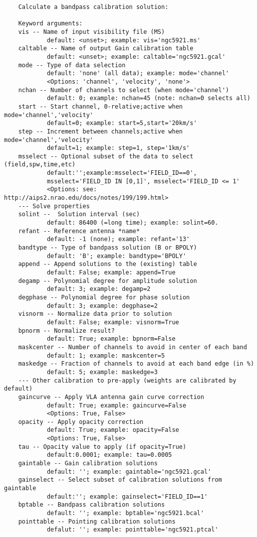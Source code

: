 \small
\begin{verbatim}
    Calculate a bandpass calibration solution:
    
    Keyword arguments:
    vis -- Name of input visibility file (MS)
            default: <unset>; example: vis='ngc5921.ms'
    caltable -- Name of output Gain calibration table
            default: <unset>; example: caltable='ngc5921.gcal'
    mode -- Type of data selection
            default: 'none' (all data); example: mode='channel'
            <Options: 'channel', 'velocity', 'none'>
    nchan -- Number of channels to select (when mode='channel')
            default: 0; example: nchan=45 (note: nchan=0 selects all)
    start -- Start channel, 0-relative;active when mode='channel','velocity'
            default=0; example: start=5,start='20km/s'
    step -- Increment between channels;active when mode='channel','velocity'
            default=1; example: step=1, step='1km/s'
    msselect -- Optional subset of the data to select (field,spw,time,etc)
            default:'';example:msselect='FIELD_ID==0', 
            msselect='FIELD_ID IN [0,1]', msselect='FIELD_ID <= 1'
            <Options: see: http://aips2.nrao.edu/docs/notes/199/199.html>
    --- Solve properties
    solint --  Solution interval (sec)
            default: 86400 (=long time); example: solint=60.
    refant -- Reference antenna *name*
            default: -1 (none); example: refant='13'
    bandtype -- Type of bandpass solution (B or BPOLY)
            default: 'B'; example: bandtype='BPOLY'
    append -- Append solutions to the (existing) table
            default: False; example: append=True
    degamp -- Polynomial degree for amplitude solution
            default: 3; example: degamp=2
    degphase -- Polynomial degree for phase solution
            default: 3; example: degphase=2
    visnorm -- Normalize data prior to solution
            default: False; example: visnorm=True
    bpnorm -- Normalize result?
            default: True; example: bpnorm=False
    maskcenter -- Number of channels to avoid in center of each band
            default: 1; example: maskcenter=5
    maskedge -- Fraction of channels to avoid at each band edge (in %)
            default: 5; example: maskedge=3
    --- Other calibration to pre-apply (weights are calibrated by default)
    gaincurve -- Apply VLA antenna gain curve correction
            default: True; example: gaincurve=False
            <Options: True, False>
    opacity -- Apply opacity correction
            default: True; example: opacity=False
            <Options: True, False>
    tau -- Opacity value to apply (if opacity=True)
            default:0.0001; example: tau=0.0005
    gaintable -- Gain calibration solutions
            default: ''; example: gaintable='ngc5921.gcal'
    gainselect -- Select subset of calibration solutions from gaintable
            default:''; example: gainselect='FIELD_ID==1'
    bptable -- Bandpass calibration solutions
            default: ''; example: bptable='ngc5921.bcal'
    pointtable -- Pointing calibration solutions
            defalut: ''; example: pointtable='ngc5921.ptcal'
\end{verbatim}
\normalsize


